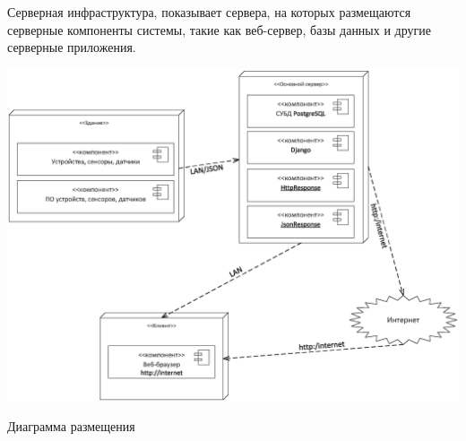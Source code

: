 Серверная инфраструктура, показывает сервера, на которых размещаются серверные компоненты системы, такие как веб-сервер, базы данных и другие серверные приложения.


\begin{landscape}
	
	\begin{плакат}
		\includegraphics[width=0.82\linewidth]{place}
		\caption{Диаграмма размещения}
		\label{place:image}      
	\end{плакат}
\end{landscape}



